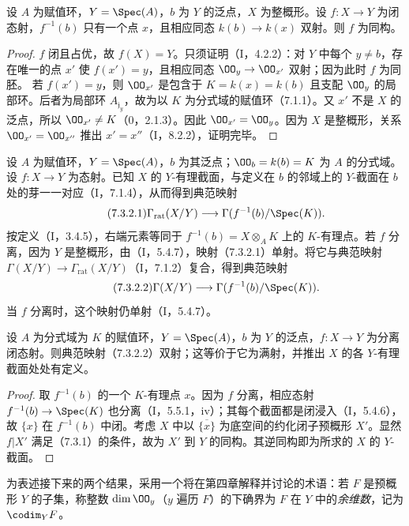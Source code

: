 设 $A$ 为赋值环，$Y=\Spec(A)$，$b$ 为 $Y$ 的泛点，$X$ 为整概形。设 $f:X\to Y$ 为闭态射，$f^{-1}(b)$ 只有一个点 $x$，且相应同态 $k(b)\to k(x)$ 双射。则 $f$ 为同构。
\begin{proof}
$f$ 闭且占优，故 $f(X)=Y$。只须证明（I，4.2.2）：对 $Y$ 中每个 $y\ne b$，存在唯一的点 $x'$ 使 $f(x')=y$，且相应同态 $\OO_y\to\OO_{x'}$ 双射；因为此时 $f$ 为同胚。
若 $f(x')=y$，则 $\OO_{x'}$ 是包含于 $K=k(x)=k(b)$ 且支配 $\OO_y$ 的局部环。后者为局部环 $A_{\mathfrak j_y}$，故为以 $K$ 为分式域的赋值环（7.1.1）。又 $x'$ 不是 $X$ 的泛点，所以 $\OO_{x'}\ne K$（0，2.1.3）。因此 $\OO_{x'}=\OO_y$。因为 $X$ 是整概形，关系 $\OO_{x'}=\OO_{x''}$ 推出 $x'=x''$（I，8.2.2），证明完毕。
\end{proof}

设 $A$ 为赋值环，$Y=\Spec(A)$，$b$ 为其泛点；$\OO_b=k(b)=K$ 为 $A$ 的分式域。设 $f:X\to Y$ 为态射。已知 $X$ 的 $Y$-有理截面，与定义在 $b$ 的邻域上的 $Y$-截面在 $b$ 处的芽一一对应（I，7.1.4），从而得到典范映射
\begin{equation}\tag{7.3.2.1}
\Gamma_{\mathrm{rat}}(X/Y)\longrightarrow
\Gamma(f^{-1}(b)/\Spec(K)).
\end{equation}
按定义（I，3.4.5），右端元素等同于 $f^{-1}(b)=X\otimes_A K$ 上的 $K$-有理点。若 $f$ 分离，因为 $Y$ 是整概形，由（I，5.4.7），映射（7.3.2.1）单射。将它与典范映射
$\Gamma(X/Y)\to\Gamma_{\mathrm{rat}}(X/Y)$（I，7.1.2）复合，得到典范映射
\begin{equation}\tag{7.3.2.2}
\Gamma(X/Y)\longrightarrow\Gamma(f^{-1}(b)/\Spec(K)).
\end{equation}
当 $f$ 分离时，这个映射仍单射（I，5.4.7）。

设 $A$ 为分式域为 $K$ 的赋值环，$Y=\Spec(A)$，$b$ 为 $Y$ 的泛点，$f:X\to Y$ 为分离闭态射。则典范映射（7.3.2.2）双射；这等价于它为满射，并推出 $X$ 的各 $Y$-有理截面处处有定义。
\begin{proof}
取 $f^{-1}(b)$ 的一个 $K$-有理点 $x$。因为 $f$ 分离，相应态射 $f^{-1}(b)\to\Spec(K)$ 也分离（I，5.5.1，iv）；其每个截面都是闭浸入（I，5.4.6），故 $\{x\}$ 在 $f^{-1}(b)$ 中闭。考虑 $X$ 中以 $\overline{\{x\}}$ 为底空间的约化闭子预概形 $X'$。显然 $f|X'$ 满足（7.3.1）的条件，故为 $X'$ 到 $Y$ 的同构。其逆同构即为所求的 $X$ 的 $Y$-截面。
\end{proof}

为表述接下来的两个结果，采用一个将在第四章解释并讨论的术语：若 $F$ 是预概形 $Y$ 的子集，称整数 $\dim\OO_y$（$y$ 遍历 $F$）的下确界为 $F$ 在 $Y$ 中的\emph{余维数}，记为 $\codim_Y F$。

